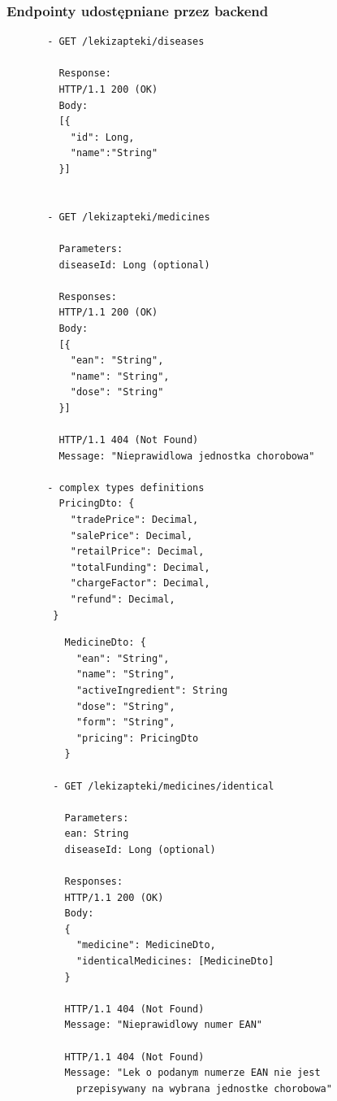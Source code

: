 \documentclass{article}
\begin{document}
    \subsubsection{Endpointy udostępniane przez backend}
    \noindent
    \begin{minipage}{.45\textwidth}
     \begin{lstlisting}
       - GET /lekizapteki/diseases

         Response:
         HTTP/1.1 200 (OK)
         Body:
         [{
           "id": Long,
           "name":"String"
         }]


       - GET /lekizapteki/medicines

         Parameters:
         diseaseId: Long (optional)

         Responses:
         HTTP/1.1 200 (OK)
         Body:
         [{
           "ean": "String",
           "name": "String",
           "dose": "String"
         }]

         HTTP/1.1 404 (Not Found)
         Message: "Nieprawidlowa jednostka chorobowa"

       - complex types definitions
         PricingDto: {
           "tradePrice": Decimal,
           "salePrice": Decimal,
           "retailPrice": Decimal,
           "totalFunding": Decimal,
           "chargeFactor": Decimal,
           "refund": Decimal,
        }

     \end{lstlisting}
    \end{minipage}\hfill
    \begin{minipage}{.45\textwidth}
      \begin{lstlisting}
          MedicineDto: {
            "ean": "String",
            "name": "String",
            "activeIngredient": String
            "dose": "String",
            "form": "String",
            "pricing": PricingDto
          }

        - GET /lekizapteki/medicines/identical

          Parameters:
          ean: String
          diseaseId: Long (optional)

          Responses:
          HTTP/1.1 200 (OK)
          Body:
          {
            "medicine": MedicineDto,
            "identicalMedicines: [MedicineDto]
          }

          HTTP/1.1 404 (Not Found)
          Message: "Nieprawidlowy numer EAN"

          HTTP/1.1 404 (Not Found)
          Message: "Lek o podanym numerze EAN nie jest
            przepisywany na wybrana jednostke chorobowa"
      \end{lstlisting}
    \end{minipage}
\end{document}
